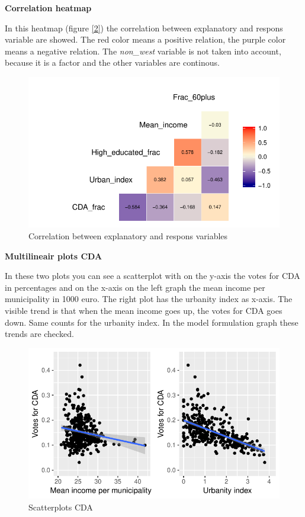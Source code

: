\documentclass[11pt,]{article}
\begin{document}
\textbf{Correlation heatmap}

In this heatmap (figure \ref{2}) the correlation between explanatory and
respons variable are showed. The red color means a positive relation,
the purple color means a negative relation. The \emph{non\_west}
variable is not taken into account, because it is a factor and the other
variables are continous.

\begin{figure}[H]

{\centering \includegraphics{Report_files/figure-latex/correlation_heatmap-1} 

}

\caption{\label{2}Correlation between explanatory and respons variables}\label{fig:correlation_heatmap}
\end{figure}

\textbf{Multilineair plots CDA }

In these two plots you can see a scatterplot with on the y-axis the
votes for CDA in percentages and on the x-axis on the left graph the
mean income per municipality in 1000 euro. The right plot has the
urbanity index as x-axis. The visible trend is that when the mean income
goes up, the votes for CDA goes down. Same counts for the urbanity
index. In the model formulation graph these trends are checked.

\begin{figure}[H]

{\centering \includegraphics{Report_files/figure-latex/unnamed-chunk-5-1} 

}

\caption{\label{3}Scatterplots CDA}\label{fig:unnamed-chunk-5}
\end{figure}
\end{document}
